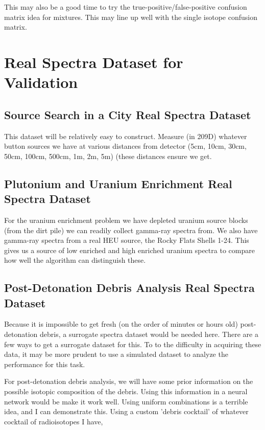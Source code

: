 \documentclass[thesis,tocnosub,noragright,centerchapter,12pt,fullpage]{uiucecethesis09}
\begin{document}
This may also be a good time to try the true-positive/false-positive confusion matrix idea for mixtures. This may line up well with the single isotope confusion matrix.



\section{Real Spectra Dataset for Validation}

\subsection{Source Search in a City Real Spectra Dataset}

This dataset will be relatively easy to construct. Measure (in 209D) whatever button sources we have at various distances from detector (5cm, 10cm, 30cm, 50cm, 100cm, 500cm, 1m, 2m, 5m) (these distances ensure we get.

\subsection{Plutonium and Uranium Enrichment Real Spectra Dataset}

For the uranium enrichment problem we have depleted uranium source blocks (from the dirt pile) we can readily collect gamma-ray spectra from. We also have gamma-ray spectra from a real HEU source, the Rocky Flats Shells 1-24. This gives us a source of low enriched and high enriched uranium spectra to compare how well the algorithm can distinguish these.  

\subsection{Post-Detonation Debris Analysis Real Spectra Dataset}

Because it is impossible to get fresh (on the order of minutes or hours old) post-detonation debris, a surrogate spectra dataset would be needed here. There are a few ways to get a surrogate dataset for this. To to the difficulty in acquiring these data, it may be more prudent to use a simulated dataset to analyze the performance for this task.



For post-detonation debris analysis, we will have some prior information on the possible isotopic composition of the debris. Using this information in a neural network would be make it work well. Using uniform combinations is a terrible idea, and I can demonstrate this. Using a custom 'debris cocktail' of whatever cocktail of radioisotopes I have, 
\end{document}
